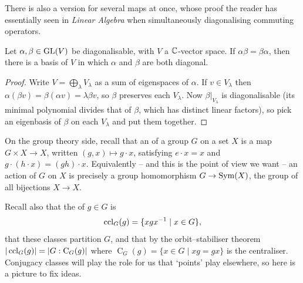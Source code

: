 \documentclass[a4paper]{scrartcl}
\newcommand{\Cent}{\operatorname{C}}
\begin{document}
There is also a version for several maps at once, whose proof the reader has essentially seen in \emph{Linear Algebra} when simultaneously diagonalising commuting operators.

\begin{proposition}
	Let $\alpha, \beta \in \operatorname{GL}(V)$ be diagonalisable, with $V$ a $\mathbb{C}$-vector space. If $\alpha\beta = \beta\alpha$, then there is a basis of $V$ in which $\alpha$ and $\beta$ are both diagonal.
\end{proposition}
\begin{proof}
	Write $V = \bigoplus_{\lambda} V_\lambda$ as a sum of eigenspaces of $\alpha$. If $v \in V_\lambda$ then $\alpha(\beta v) = \beta(\alpha v) = \lambda \beta v$, so $\beta$ preserves each $V_\lambda$. Now $\beta|_{V_\lambda}$ is diagonalisable (its minimal polynomial divides that of $\beta$, which has distinct linear factors), so pick an eigenbasis of $\beta$ on each $V_\lambda$ and put them together.
\end{proof}

On the group theory side, recall that an  of a group $G$ on a set $X$ is a map $G \times X \to X$, written $(g, x) \mapsto g \cdot x$, satisfying $e \cdot x = x$ and $g\cdot(h \cdot x) = (gh)\cdot x$. Equivalently -- and this is the point of view we want -- an action of $G$ on $X$ is precisely a group homomorphism $G \to \operatorname{Sym}(X)$, the group of all bijections $X \to X$.

Recall also that the  of $g \in G$ is
$$\operatorname{ccl}_G(g) = \{ x g x^{-1} \mid x \in G \},$$
that these classes partition $G$, and that by the orbit--stabiliser theorem $|\ccl_G(g)| = |G : \Cent_G(g)|$ where $\Cent_G(g) = \{x \in G \mid xg = gx\}$ is the centraliser. Conjugacy classes will play the role for us that `points' play elsewhere, so here is a picture to fix ideas.

\begin{center}
\end{center}
\end{document}
